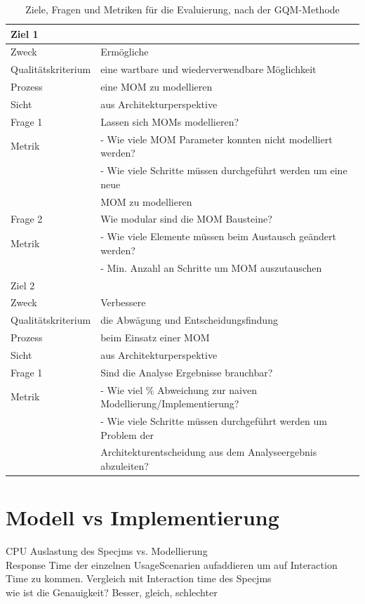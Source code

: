 \begin{table}
  \begin{tabular}{|l|l|}
    \hline
    \multicolumn{2}{|l|}{Ziel 1} \\
    \hline
    Zweck & Ermögliche \\
    Qualitätskriterium & eine wartbare und wiederverwendbare Möglichkeit  \\ 
    Prozess & eine MOM zu modellieren \\
    Sicht & aus Architekturperspektive \\
   
    \hline \hline
    Frage 1 & Lassen sich MOMs modellieren? \\
    \hline
    Metrik & - Wie viele MOM Parameter konnten nicht modelliert werden? \\
    & - Wie viele Schritte müssen durchgeführt werden um eine neue \\
    & MOM zu modellieren\\
    \hline\hline
    Frage 2 & Wie modular sind die MOM Bausteine? \\
    \hline
    Metrik & - Wie viele Elemente müssen beim Austausch geändert werden? \\
    & - Min. Anzahl an Schritte um MOM auszutauschen \\
    \hline\hline
    \multicolumn{2}{|l|}{Ziel 2} \\
    \hline
    Zweck & Verbessere \\
    Qualitätskriterium & die Abwägung und Entscheidungsfindung  \\ 
    Prozess & beim Einsatz einer MOM \\
    Sicht & aus Architekturperspektive \\
    \hline \hline
    Frage 1 & Sind die Analyse Ergebnisse brauchbar? \\
    \hline
    Metrik & - Wie viel \% Abweichung zur naiven Modellierung/Implementierung? \\
    & - Wie viele Schritte müssen durchgeführt werden um Problem der \\
    & Architekturentscheidung aus dem Analyseergebnis abzuleiten? \\
    \hline
  \end{tabular}
	\caption{\label{tab:gqm} Ziele, Fragen und Metriken für die Evaluierung, nach der GQM-Methode}
\end{table}

\section{Modell vs Implementierung}
CPU Auslastung des Specjms vs. Modellierung\\
Response Time der einzelnen UsageScenarien aufaddieren um auf Interaction Time zu kommen. Vergleich mit Interaction time des Specjms\\
wie ist die Genauigkeit? Besser, gleich, schlechter\\


